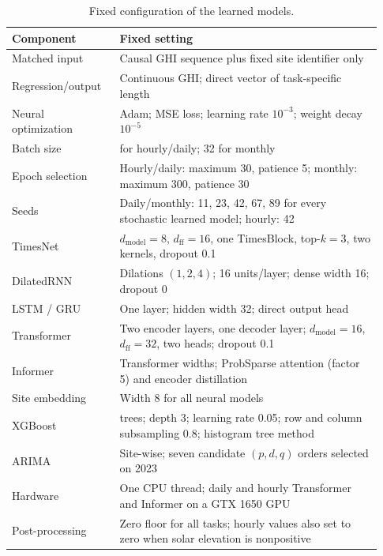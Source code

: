 \begin{table}[!t]
\centering
\caption{Fixed configuration of the learned models.}
\label{tab:hyperparameters}
\footnotesize
\setlength{\tabcolsep}{3pt}
\renewcommand{\arraystretch}{1.12}
\begin{tabular}{@{}
  >{\raggedright\arraybackslash}p{0.27\linewidth}
  >{\raggedright\arraybackslash}p{0.66\linewidth}@{}}
\toprule
\textbf{Component} & \textbf{Fixed setting} \\
\midrule
Matched input & Causal GHI sequence plus fixed site identifier only \\
Regression/output & Continuous GHI; direct vector of task-specific length \\
Neural optimization & Adam; MSE loss; learning rate $10^{-3}$;
weight decay $10^{-5}$ \\
Batch size & 128 for hourly/daily; 32 for monthly \\
Epoch selection & Hourly/daily: maximum 30, patience 5; monthly:
maximum 300, patience 30 \\
Seeds & Daily/monthly: 11, 23, 42, 67, 89 for every stochastic learned
model; hourly: 42 \\
TimesNet & $d_{\mathrm{model}}=8$, $d_{\mathrm{ff}}=16$, one TimesBlock,
top-$k=3$, two kernels, dropout 0.1 \\
DilatedRNN & Dilations $(1,2,4)$; 16 units/layer; dense width 16;
dropout 0 \\
LSTM / GRU & One layer; hidden width 32; direct output head \\
Transformer & Two encoder layers, one decoder layer;
$d_{\mathrm{model}}=16$, $d_{\mathrm{ff}}=32$, two heads; dropout 0.1 \\
Informer & Transformer widths; ProbSparse attention (factor 5) and
encoder distillation \\
Site embedding & Width 8 for all neural models \\
XGBoost & 150 trees; depth 3; learning rate 0.05; row and column
subsampling 0.8; histogram tree method \\
ARIMA & Site-wise; seven candidate $(p,d,q)$ orders selected on 2023 \\
Hardware & One CPU thread; daily and hourly Transformer and Informer on
a GTX 1650 GPU \\
Post-processing & Zero floor for all tasks; hourly values also set to zero
when solar elevation is nonpositive \\
\bottomrule
\end{tabular}
\end{table}
